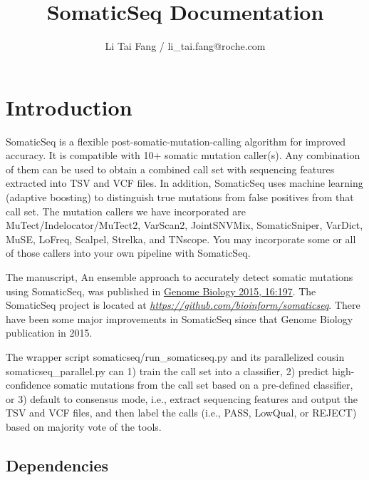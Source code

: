 \documentclass[10pt,letterpaper]{article}
\author{Li Tai Fang / li\_tai.fang@roche.com}
\title{SomaticSeq Documentation}
\begin{document}
\maketitle



\begin{sloppypar}




\section{Introduction} \label{Introduction}

SomaticSeq is a flexible post-somatic-mutation-calling algorithm for improved accuracy. It is compatible with 10+ somatic mutation caller(s). Any combination of them can be used to obtain a combined call set with sequencing features extracted into TSV and VCF files. In addition, SomaticSeq uses machine learning (adaptive boosting) to distinguish true mutations from false positives from that call set. The mutation callers we have incorporated are MuTect/Indelocator/MuTect2, VarScan2, JointSNVMix, SomaticSniper, VarDict, MuSE, LoFreq, Scalpel, Strelka, and TNscope. You may incorporate some or all of those callers into your own pipeline with SomaticSeq.

The manuscript, An ensemble approach to accurately detect somatic mutations using SomaticSeq, was published in \href{http://dx.doi.org/10.1186/s13059-015-0758-2}{Genome Biology 2015, 16:197}. 
The SomaticSeq project is located at \href{https://github.com/bioinform/somaticseq}{\textit{https://github.com/bioinform/somaticseq}}. 
There have been some major improvements in SomaticSeq since that Genome Biology publication in 2015. 

The wrapper script somaticseq/run\_somaticseq.py and its parallelized cousin somaticseq\_parallel.py can 1) train the call set into a classifier, 2) predict high-confidence somatic mutations from the call set based on a pre-defined classifier, or 3) default to consensus mode, i.e., extract sequencing features and output the TSV and VCF files, and then label the calls (i.e., PASS, LowQual, or REJECT) based on majority vote of the tools.

\subsection{Dependencies}

\begin{itemize}


\end{itemize}
\end{sloppypar}
\end{document}
